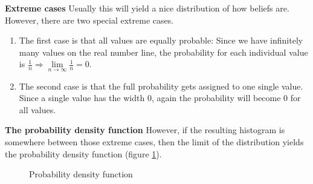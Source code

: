 \begin{samepage}
\textbf{Extreme cases}
Usually this will yield a nice distribution of how beliefs are. However, there are two special extreme cases.

\begin{enumerate}
  \item[] The first case is that all values are equally probable: Since we have infinitely many values on the real number line, the probability for each individual value is $\frac{1}{n} \Rightarrow \lim\limits_{n\rightarrow\infty} \frac{1}{n} = 0$. 
  \item[] The second case is that the full probability gets assigned to one single value. Since a single value has the width 0, again the probability will become 0 for all values.
\end{enumerate}
\end{samepage}

\textbf{The probability density function}
However, if the resulting histogram is somewhere between those extreme cases, then the limit of the distribution yields the probability density function (figure \ref{fig:2014-05-09_pdf}).

\begin{figure}[!ht]
\centering
{}
\caption{Probability density function}
\label{fig:2014-05-09_pdf}
\end{figure}

